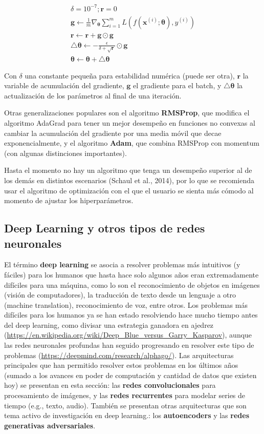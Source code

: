 \begin{gather*}
\delta = 10^{-7}; \bm{r} = 0\\
\bm{g} \longleftarrow \frac{1}{m}\nabla_{\bm{\theta}}\sum_{i=1}^{m}L(f(\bm{x}^{(i)};\bm{\theta}),y^{(i)})\\
\bm{r} \longleftarrow \bm{r} + \bm{g}\odot \bm{g}\\
\bigtriangleup\bm{\theta} \longleftarrow -\frac{\epsilon}{\delta+\sqrt{\bm{r}}}\odot \bm{g}\\
\bm{\theta} \longleftarrow \bm{\theta}+\bigtriangleup\bm{\theta}
\end{gather*}

Con $\delta$ una constante peque{\~{n}}a para estabilidad num\'erica (puede ser otra), $\bm{r}$ la variable de acumulaci\'on del gradiente, $\bm{g}$ el gradiente para el batch, y $\bigtriangleup\bm{\theta}$ la actualizaci\'on de los par\'ametros al final de una iteraci\'on.

Otras generalizaciones populares son el algoritmo \textbf{RMSProp}, que modifica el algoritmo AdaGrad para tener un mejor desempe{\~{n}}o en funciones no convexas al cambiar la acumulaci\'on del gradiente por una media m\'ovil que decae exponencialmente, y el algoritmo \textbf{Adam}, que combina RMSProp con momentum (con algunas distinciones importantes).

Hasta el momento no hay un algoritmo que tenga un desempe{\~{n}}o superior al de los dem\'as en distintos escenarios (Schaul et al., 2014), por lo que se recomienda usar el algoritmo de optimizaci\'on con el que el usuario se sienta m\'as c\'omodo al momento de ajustar los hiperpar\'ametros.

\subsection{Deep Learning y otros tipos de redes neuronales}

El t\'ermino \textbf{deep learning} se asocia a resolver problemas m\'as intuitivos (y f\'aciles) para los humanos que hasta hace solo algunos a{\~{n}}os eran extremadamente dif\'iciles para una m\'aquina, como lo son el reconocimiento de objetos en im\'agenes (visi\'on de computadores), la traducci\'on de texto desde un lenguaje a otro (machine translation), reconocimiento de voz, entre otros. Los problemas m\'as dif\'iciles para los humanos ya se han estado resolviendo hace mucho tiempo antes del deep learning, como divisar una estrategia ganadora en ajedrez (\url{https://en.wikipedia.org/wiki/Deep_Blue_versus_Garry_Kasparov}), aunque las redes neuronales profundas han seguido progresando en resolver este tipo de problemas (\url{https://deepmind.com/research/alphago/}). Las arquitecturas principales que han permitido resolver estos problemas en los \'ultimos a{\~{n}}os (sumado a los avances en poder de computaci\'on y cantidad de datos que existen hoy) se presentan en esta secci\'on: las \textbf{redes convolucionales} para procesamiento de im\'agenes, y las \textbf{redes recurrentes} para modelar series de tiempo (e.g., texto, audio). Tambi\'en se presentan otras arquitecturas que son tema activo de investigaci\'on en deep learning.: los \textbf{autoencoders} y las \textbf{redes generativas adversariales}.

